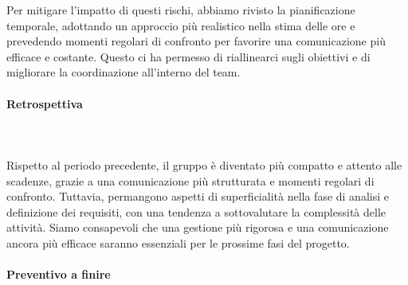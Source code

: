 Per mitigare l'impatto di questi rischi, abbiamo rivisto la pianificazione temporale, adottando un approccio più realistico nella stima delle ore e prevedendo momenti regolari di confronto per favorire una comunicazione più efficace e costante. Questo ci ha permesso di riallinearci sugli obiettivi e di migliorare la coordinazione all'interno del team.

\paragraph{Retrospettiva} \hspace{1cm} 
\\ \hspace{1cm} \\
Rispetto al periodo precedente, il gruppo è diventato più compatto e attento alle scadenze, grazie a una comunicazione più strutturata e momenti regolari di confronto. Tuttavia, permangono aspetti di superficialità nella fase di analisi e definizione dei requisiti, con una tendenza a sottovalutare la complessità delle attività. Siamo consapevoli che una gestione più rigorosa e una comunicazione ancora più efficace saranno essenziali per le prossime fasi del progetto.

\paragraph{Preventivo a finire} \hspace{1cm}

